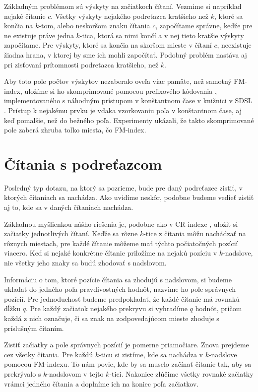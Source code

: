 Základným problémom sú výskyty na začiatkoch čítaní. Vezmime si napríklad nejaké čítanie $c$.
Všetky výskyty nejakého podreťazca kratšieho než $k$, ktoré sa končia na $k$-tom, alebo
neskoršom znaku čítania $c$, započítame správne, keďže pre ne existuje práve jedna $k$-tica,
ktorá sa nimi končí a v nej tieto kratšie výskyty započítame. Pre výskyty, ktoré sa končia
na skoršom mieste v čítaní $c$, neexistuje žiadna hrana, v ktorej by sme ich mohli
započítať. Podobný problém nastáva aj pri zisťovaní prítomnosti podreťazca kratšieho, než $k$.

Aby toto pole počtov výskytov nezaberalo oveľa viac pamäte, než samotný FM-index, uložíme
si ho skomprimované pomocou prefixového kódovania \cite{integer_coding}, implementovaného
s náhodným prístupom v konštantnom čase v knižnici v SDSL \cite{sdsl}. Prístup k nejakému
prvku je vďaka vzorkovaniu poľa v konštantnom čase, aj keď pomalšie, než do bežného poľa.
Experimenty ukázali, že takto skomprimované pole zaberá zhruba toľko miesta,
čo FM-index.

\section{Čítania s podreťazcom}

Posledný typ dotazu, na ktorý sa pozrieme, bude pre daný podreťazec zistiť, v
ktorých čítaniach sa nachádza. Ako uvidíme neskôr, podobne budeme vedieť zistiť
aj to, kde sa v daných čítaniach nachádza.

Základnou myšlienkou nášho riešenia je, podobne ako v CR-indexe \cite{cr_index}, uložiť si
začiatky jednotlivých čítaní. Keďže sa rôzne $k$-tice z čítania môžu nachádzať
na rôznych miestach, pre každé čítanie môžeme mať týchto počiatočných pozícií viacero.
Keď si nejaké konkrétne čítanie priložíme na nejakú pozíciu v $k$-nadslove,
nie všetky jeho znaky sa budú zhodovať s nadslovom.

Informáciu o tom, ktoré pozície čítania sa zhodujú s nadslovom, si budeme ukladať
do jedného poľa pravdivostných hodnôt, nazvime ho pole správnych pozícií. Pre jednoduchosť budeme predpokladať, že
každé čítanie má rovnakú dĺžku $q$. Pre každý začiatok nejakého prekryvu si
vyhradíme $q$ hodnôt, pričom každá z nich označuje, či sa znak na zodpovedajúcom mieste zhoduje s príslušným čítaním.

Zistiť začiatky a pole správnych pozícií je pomerne priamočiare. Znova prejdeme cez všetky čítania. 
Pre každú $k$-ticu si zistíme, kde sa nachádza v $k$-nadslove pomocou FM-indexu.
To nám povie, kde by sa muselo začínať čítanie tak, aby sa prekrývalo s $k$-nadslovom
v tejto $k$-tici. Nakoniec zlúčime všetky rovnaké začiatky vrámci jedného čítania a
doplníme ich na koniec poľa začiatkov.

